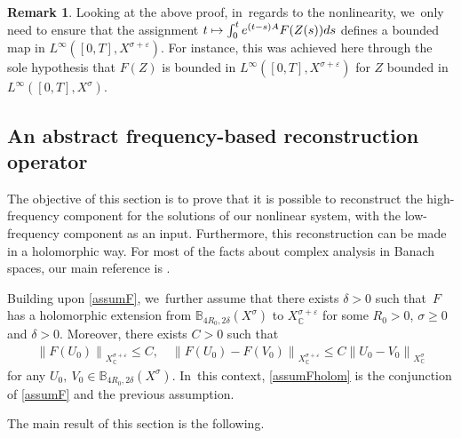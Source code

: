 \documentclass[JEP,XML,SOM,Unicode,published]{cedram}
\newcommand\mto{\mathchoice{\longmapsto}{\mapsto}{\mapsto}{\mapsto}}
\theoremstyle{definition}
\newtheorem{remark}[theorem]{Remark}
\let\veps\varepsilon
\newcommand\nor[2]{\left\|#1\right\|_{#2}}
\begin{document}
\begin{remark}\label{rk:abs-prop-reg}
Looking at the above proof, in~regards to the nonlinearity, we~only need to ensure that the assignment $t\mto \int_0^t e^{(t-s)A}F(Z(s))ds$ defines a bounded map in $L^\infty([0, T], X^{\sigma+\veps})$. For instance, this was achieved here through the sole hypothesis that $F(Z)$ is bounded in $L^\infty([0, T], X^{\sigma+\veps})$ for $Z$ bounded in $L^\infty([0, T], X^\sigma)$.
\end{remark}

\subsection{An abstract frequency-based reconstruction operator} The objective of this section is to prove that it is possible to reconstruct the high-frequency component for the solutions of our nonlinear system, with the low-frequency component as an input. Furthermore, this reconstruction can be made in a holomorphic way. For most of the facts about complex analysis in Banach spaces, our main reference is \cite{Muj86}.

Building upon \cref{assumF}, we~further assume that there exists $\delta>0$ such that~$F$ has a holomorphic extension from $\mathbb{B}_{4R_{0},2\delta}(X^{\sigma})$ to $X^{\sigma+\veps}_{\mathbb{C}}$ for some $R_{0}>0$, $\sigma\geq 0$ and $\delta>0$. Moreover, there exists $C>0$ such that
\begin{align}
\label{boundFanalytic}
\nor{F(U_{0})}{X^{\sigma+\veps}_{\mathbb{C}}}\leq C,\quad \nor{F(U_{0})-F(V_{0})}{X^{\sigma+\veps}_{\mathbb{C}}}\leq C \nor{U_{0}-V_{0}}{X^{\sigma}_{\mathbb{C}}}
\end{align}
for any $U_{0},~V_{0}\in \mathbb{B}_{4R_{0},2\delta}(X^{\sigma})$. In~this context, \cref{assumFholom} is the conjunction of \cref{assumF} and the previous assumption.

The main result of this section is the following.
\end{document}
